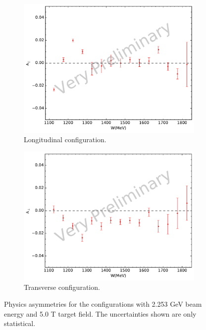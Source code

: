 \begin{figure}[p!]
  \centering
  \begin{subfigure}[t]{0.79\textwidth}
    \includegraphics[width=\textwidth]{figs/asymmetry-22535000.pdf}
    \caption{Longitudinal configuration. \label{C8S1F1a}}
  \end{subfigure}
  \begin{subfigure}[t]{0.79\textwidth}
    \includegraphics[width=\textwidth]{figs/asymmetry-22535090.pdf}
    \caption{Transverse configuration. \label{C8S1F1b}}
  \end{subfigure}
  \caption[Physics asymmetries with $E=2.253$ GeV and $B=5.0$ T.]{Physics asymmetries for the configurations with 2.253 GeV beam energy and 5.0 T target field. The uncertainties shown are only statistical. \label{C8S1F1}}
\end{figure}

